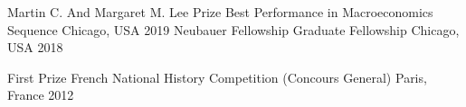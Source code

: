 

\begin{cvhonors}

    \cvhonor
    {Martin C. And Margaret M. Lee Prize} %
    {Best Performance in Macroeconomics Sequence} %
    {Chicago, USA} %
    {2019} %
    \cvhonor
    {Neubauer Fellowship} %
    {Graduate Fellowship} %
    {Chicago, USA} %
    {2018} %

    \cvhonor
    {First Prize} %
    {French National History Competition (Concours General)} %
    {Paris, France} %
    {2012} %

\end{cvhonors}
